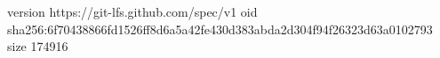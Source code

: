 version https://git-lfs.github.com/spec/v1
oid sha256:6f70438866fd1526ff8d6a5a42fe430d383abda2d304f94f26323d63a0102793
size 174916
